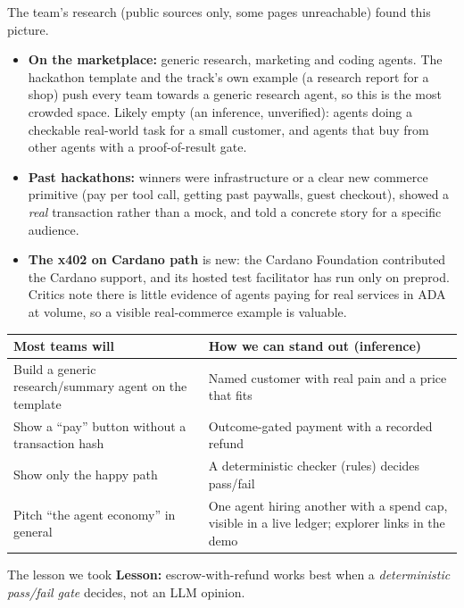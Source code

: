 The team's research (public sources only, some pages unreachable) found this picture.
\begin{itemize}
  \item \textbf{On the marketplace:} generic research, marketing and coding agents. The hackathon template and the track's own example (a research report for a shop) push every team towards a generic research agent, so this is the most crowded space. Likely empty (an inference, unverified): agents doing a checkable real-world task for a small customer, and agents that buy from other agents with a proof-of-result gate.
  \item \textbf{Past hackathons:} winners were infrastructure or a clear new commerce primitive (pay per tool call, getting past paywalls, guest checkout), showed a \emph{real} transaction rather than a mock, and told a concrete story for a specific audience.
  \item \textbf{The x402 on Cardano path} is new: the Cardano Foundation contributed the Cardano support, and its hosted test facilitator has run only on preprod. Critics note there is little evidence of agents paying for real services in ADA at volume, so a visible real-commerce example is valuable.
\end{itemize}

\begin{center}
\small
\begin{tabularx}{\textwidth}{@{}XX@{}}
\toprule
\textbf{Most teams will} & \textbf{How we can stand out (inference)} \\
\midrule
Build a generic research/summary agent on the template & Named customer with real pain and a price that fits \\
Show a ``pay'' button without a transaction hash & Outcome-gated payment with a recorded refund \\
Show only the happy path & A deterministic checker (rules) decides pass/fail \\
Pitch ``the agent economy'' in general & One agent hiring another with a spend cap, visible in a live ledger; explorer links in the demo \\
\bottomrule
\end{tabularx}
\end{center}

\begin{conceptbox}{The lesson we took}
\textbf{Lesson:} escrow-with-refund works best when a \emph{deterministic pass/fail gate} decides, not an LLM opinion.
\end{conceptbox}

